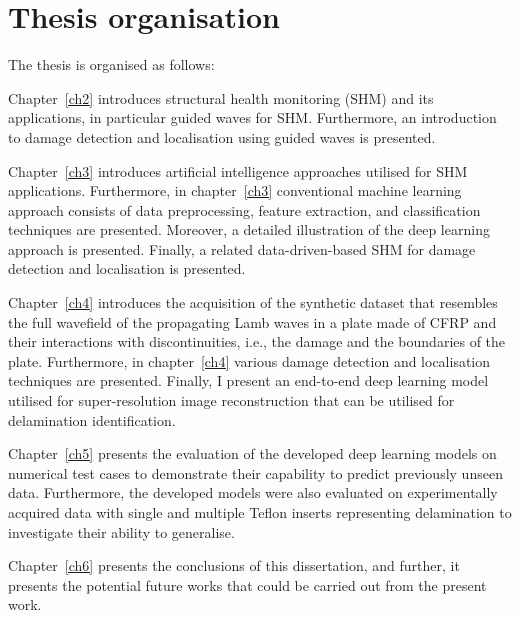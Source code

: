 \section{Thesis organisation}
\label{sec15}
The thesis is organised as follows:

Chapter~\ref{ch2} introduces structural health monitoring (SHM) and its applications, in particular guided waves for SHM.
Furthermore, an introduction to damage detection and localisation using guided waves is presented.

Chapter~\ref{ch3} introduces artificial intelligence approaches utilised for SHM applications.
Furthermore, in chapter~\ref{ch3}  conventional machine learning approach consists of data preprocessing, feature extraction, and classification techniques are presented.
Moreover, a detailed illustration of the deep learning approach is presented.
Finally, a related data-driven-based SHM for damage detection and localisation is presented.

Chapter~\ref{ch4} introduces the acquisition of the synthetic dataset that resembles the full wavefield of the propagating Lamb waves in a plate made of CFRP and their interactions with discontinuities, i.e., the damage and the boundaries of the plate.
Furthermore, in chapter~\ref{ch4} various damage detection and localisation techniques are presented.
Finally, I present an end-to-end deep learning model utilised for super-resolution image reconstruction that can be utilised for delamination identification.

Chapter~\ref{ch5} presents the evaluation of the developed deep learning models on numerical test cases to demonstrate their capability to predict previously unseen data.
Furthermore, the developed models were also evaluated on experimentally acquired data with single and multiple Teflon inserts representing delamination to investigate their ability to generalise.

Chapter~\ref{ch6} presents the conclusions of this dissertation, and further, it presents the potential future works that could be carried out from the present work.

